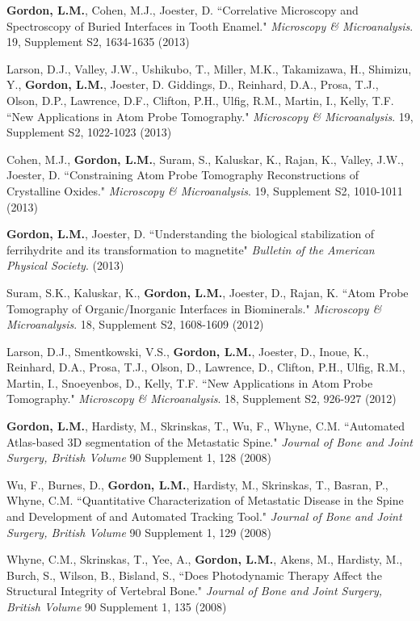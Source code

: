\textbf{Gordon, L.M.}, Cohen, M.J., Joester, D. ``Correlative Microscopy and Spectroscopy of Buried Interfaces in Tooth Enamel." \emph{Microscopy \& Microanalysis}. 19, Supplement S2, 1634-1635 (2013)

Larson, D.J., Valley, J.W., Ushikubo, T., Miller, M.K., Takamizawa, H., Shimizu, Y., \textbf{Gordon, L.M.}, Joester, D. Giddings, D., Reinhard, D.A., Prosa, T.J., Olson, D.P., Lawrence, D.F., Clifton, P.H., Ulfig, R.M., Martin, I., Kelly, T.F. ``New Applications in Atom Probe Tomography." \emph{Microscopy \& Microanalysis}. 19, Supplement S2, 1022-1023 (2013)

Cohen, M.J., \textbf{Gordon, L.M.}, Suram, S., Kaluskar, K., Rajan, K., Valley, J.W., Joester, D. ``Constraining Atom Probe Tomography Reconstructions of Crystalline Oxides." \emph{Microscopy \& Microanalysis}. 19, Supplement S2, 1010-1011 (2013)

\textbf{Gordon, L.M.}, Joester, D. ``Understanding the biological stabilization of ferrihydrite and its transformation to magnetite" \emph{Bulletin of the American Physical Society}. (2013)

Suram, S.K., Kaluskar, K., \textbf{Gordon, L.M.}, Joester, D., Rajan, K. ``Atom Probe Tomography of Organic/Inorganic Interfaces in Biominerals." \emph{Microscopy \& Microanalysis}. 18, Supplement S2, 1608-1609 (2012)

Larson, D.J., Smentkowski, V.S., \textbf{Gordon, L.M.}, Joester, D., Inoue, K.,  Reinhard, D.A., Prosa, T.J., Olson, D., Lawrence, D., Clifton, P.H., Ulfig, R.M., Martin, I., Snoeyenbos, D., Kelly, T.F. ``New Applications in Atom Probe Tomography." \emph{Microscopy \& Microanalysis}. 18, Supplement S2, 926-927 (2012)

\textbf{Gordon, L.M.}, Hardisty, M., Skrinskas, T., Wu, F., Whyne, C.M. ``Automated Atlas-based 3D segmentation of the Metastatic Spine." \emph{Journal of Bone and Joint Surgery, British Volume} 90 Supplement 1, 128 (2008)

Wu, F., Burnes, D., \textbf{Gordon, L.M.}, Hardisty, M., Skrinskas, T., Basran, P., Whyne, C.M. ``Quantitative Characterization of Metastatic Disease in the Spine and Development of and Automated Tracking Tool." \emph{Journal of Bone and Joint Surgery, British Volume} 90 Supplement 1, 129 (2008)

Whyne, C.M., Skrinskas, T., Yee, A., \textbf{Gordon, L.M.}, Akens, M., Hardisty, M., Burch, S., Wilson, B., Bisland, S., ``Does Photodynamic Therapy Affect the Structural Integrity of Vertebral Bone." \emph{Journal of Bone and Joint Surgery, British Volume} 90 Supplement 1, 135 (2008)

